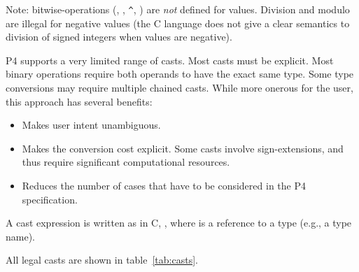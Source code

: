 \documentclass[12pt]{article}
\begin{document}
Note: bitwise-operations (\code{|}, \code{\&}, \verb|^|, \code{\~{}})
are \emph{not} defined for \infint{} values.  Division and modulo are
illegal for negative values (the C language does not give a clear
semantics to division of signed integers when values are negative).



P4 supports a very limited range of casts.  Most casts must be
explicit.  Most binary operations require both operands to have the
exact same type.  Some type conversions may require multiple chained
casts.  While more onerous for the user, this approach has several
benefits:

\begin{itemize}
\item Makes user intent unambiguous.  
\item Makes the conversion cost explicit.  Some casts involve
  sign-extensions, and thus require significant computational
  resources.
\item Reduces the number of cases that have to be considered in the P4
  specification.
\end{itemize}

A cast expression is written as in C, , where
 is a reference to a type (e.g., a type name).

All legal casts are shown in table~\ref{tab:casts}.
\end{document}

